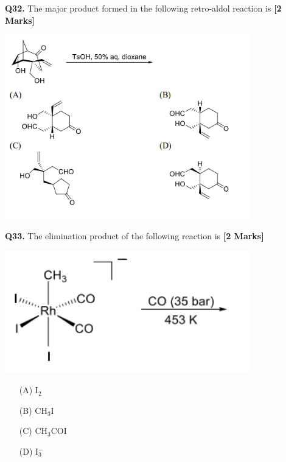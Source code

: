 \documentclass[11pt]{article}
\newcommand{\questionb}[2]{
    \noindent\textbf{Q#2.} #1 \hfill \textbf{[2 Marks]}
}
\begin{document}
\questionb{The major product formed in the following retro-aldol reaction is}{32}
\begin{center}
\includegraphics[width=0.8\textwidth]{figures/32.png}
\end{center}

\vspace{0.5cm}

\questionb{The elimination product of the following reaction is}{33}
\begin{center}
\includegraphics[width=0.8\textwidth]{figures/33.png}
\end{center}
\begin{enumerate}
    \item[(A)] I$_2$
    \item[(B)] CH$_3$I
    \item[(C)] CH$_3$COI
    \item[(D)] I$_3^-$
\end{enumerate}
\vspace{0.5cm}
\end{document}

